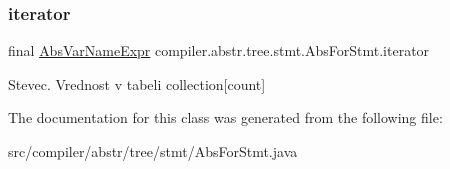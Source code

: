 \subsubsection{\texorpdfstring{iterator}{iterator}}
{\footnotesize\ttfamily final \hyperlink{classcompiler_1_1abstr_1_1tree_1_1expr_1_1_abs_var_name_expr}{Abs\+Var\+Name\+Expr} compiler.\+abstr.\+tree.\+stmt.\+Abs\+For\+Stmt.\+iterator}

Stevec. Vrednost v tabeli collection\mbox{[}count\mbox{]} 

The documentation for this class was generated from the following file\+:\begin{DoxyCompactItemize}
\item 
src/compiler/abstr/tree/stmt/Abs\+For\+Stmt.\+java\end{DoxyCompactItemize}
